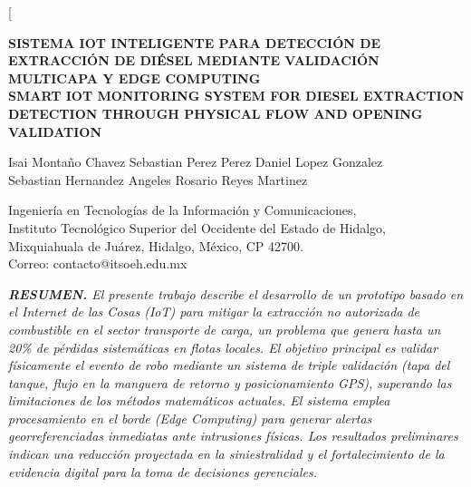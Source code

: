 \documentclass[twocolumn, 10pt]{article}
\begin{document}
\twocolumn[
  \begin{center}
    {\fontsize{14}{16}\selectfont\textbf{SISTEMA IOT INTELIGENTE PARA DETECCIÓN DE EXTRACCIÓN DE DIÉSEL MEDIANTE VALIDACIÓN MULTICAPA Y EDGE COMPUTING}} \\
    \vspace{0.4cm}
    {\fontsize{14}{16}\selectfont\textbf{SMART IOT MONITORING SYSTEM FOR DIESEL EXTRACTION DETECTION THROUGH PHYSICAL FLOW AND OPENING VALIDATION}}
  \end{center}

  \vspace{0.4cm}

  \begin{center}
    {\fontsize{10}{12}\selectfont
      Isai Montaño Chavez \quad Sebastian Perez Perez \quad Daniel Lopez Gonzalez \\
      Sebastian Hernandez Angeles \quad Rosario Reyes Martinez
    }
  \end{center}

  \begin{center}
    {\fontsize{8}{10}\selectfont
      Ingeniería en Tecnologías de la Información y Comunicaciones, \\
      Instituto Tecnológico Superior del Occidente del Estado de Hidalgo, \\
      Mixquiahuala de Juárez, Hidalgo, México, CP 42700. \\
      Correo: contacto@itsoeh.edu.mx
    }
  \end{center}

  \vspace{0.5cm}

  {\fontsize{8}{10}\selectfont
    \textit{\textbf{RESUMEN.} El presente trabajo describe el desarrollo de un prototipo basado en el Internet de las Cosas (IoT) para mitigar la extracción no autorizada de combustible en el sector transporte de carga, un problema que genera hasta un 20\% de pérdidas sistemáticas en flotas locales. El objetivo principal es validar físicamente el evento de robo mediante un sistema de triple validación (tapa del tanque, flujo en la manguera de retorno y posicionamiento GPS), superando las limitaciones de los métodos matemáticos actuales. El sistema emplea procesamiento en el borde (Edge Computing) para generar alertas georreferenciadas inmediatas ante intrusiones físicas. Los resultados preliminares indican una reducción proyectada en la siniestralidad y el fortalecimiento de la evidencia digital para la toma de decisiones gerenciales.}
  }
\end{document}
